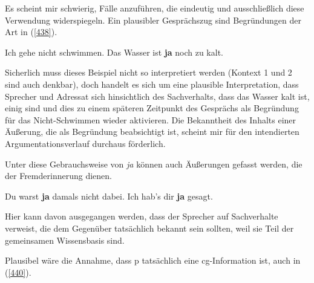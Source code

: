 Es scheint mir schwierig, Fälle anzuführen, die eindeutig und ausschließlich diese Verwendung widerspiegeln. Ein plausibler Gesprächszug sind Begründungen der Art in (\ref{438}).

\begin{exe}
	\ex\label{438} 
	Ich gehe nicht schwimmen. Das Wasser ist \textbf{ja} noch zu kalt.  
 		\hfill\hbox {\citet[132]{Dahl1988}}		
\end{exe}																						
Sicherlich muss dieses Beispiel nicht so interpretiert werden (Kontext 1 und 2 sind auch denkbar), doch handelt es sich um eine plausible Interpretation, dass Sprecher und Adressat sich hinsichtlich des Sachverhalts, dass das Wasser kalt ist, einig sind und dies zu einem späteren Zeitpunkt des Gesprächs als Begründung für das Nicht-Schwimmen wieder aktivieren. Die Bekanntheit des Inhalts einer Äußerung, die als Begründung beabsichtigt ist, scheint mir für den intendierten Argumentationsverlauf durchaus förderlich. 

Unter diese Gebrauchsweise von \textit{ja} können auch Äußerungen gefasst werden, die der Fremderinnerung dienen. 

\begin{exe}
	\ex\label{439} 
	\begin{xlist}
		\ex\label{439a} Du warst \textbf{ja} damals nicht dabei.	
 		\ex\label{439b}	Ich hab's dir \textbf{ja} gesagt.		
 		\hfill\hbox {\citet[344/345]{Reiter1980}}		
 	\end{xlist}	
\end{exe}
Hier kann davon ausgegangen werden, dass der Sprecher auf Sachverhalte verweist, die dem Gegenüber tatsächlich bekannt sein sollten, weil sie Teil der gemeinsamen Wissensbasis sind. 

Plausibel wäre die Annahme, dass p tatsächlich eine cg-Information ist, auch in (\ref{440}).

